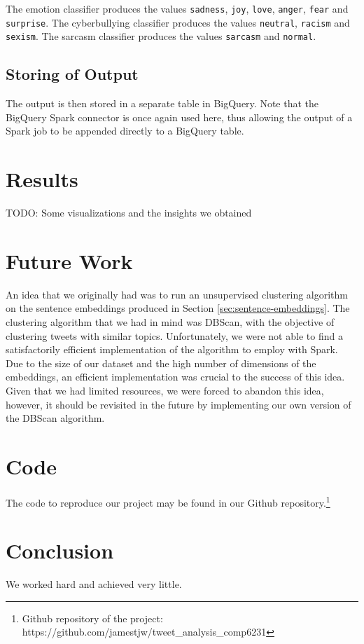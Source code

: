 \documentclass[a4paper,12pt]{article}
\begin{document}
The emotion classifier produces the values \texttt{sadness}, \texttt{joy}, \texttt{love}, \texttt{anger}, \texttt{fear} and \texttt{surprise}. The cyberbullying classifier produces the values \texttt{neutral}, \texttt{racism} and \texttt{sexism}. The sarcasm classifier produces the values \texttt{sarcasm} and \texttt{normal}. 

\subsection{Storing of Output}
The output is then stored in a separate table in BigQuery. Note that the BigQuery Spark connector is once again used here, thus allowing the output of a Spark job to be appended directly to a BigQuery table.

\section{Results}
TODO: Some visualizations and the insights we obtained

\section{Future Work}
An idea that we originally had was to run an unsupervised clustering algorithm on the sentence embeddings produced in Section \ref{sec:sentence-embeddings}. The clustering algorithm that we had in mind was DBScan\cite{Ester96adensity-based}, with the objective of clustering tweets with similar topics. Unfortunately, we were not able to find a satisfactorily efficient implementation of the algorithm to employ with Spark. Due to the size of our dataset and the high number of dimensions of the embeddings, an efficient implementation was crucial to the success of this idea. Given that we had limited resources, we were forced to abandon this idea, however, it should be revisited in the future by implementing our own version of the DBScan algorithm.

\section{Code}
The code to reproduce our project may be found in our Github repository.\footnote{Github repository of the project: https://github.com/jamestjw/tweet\_analysis\_comp6231} 

\section{Conclusion}
We worked hard and achieved very little.

\nocite{*}



\end{document}
